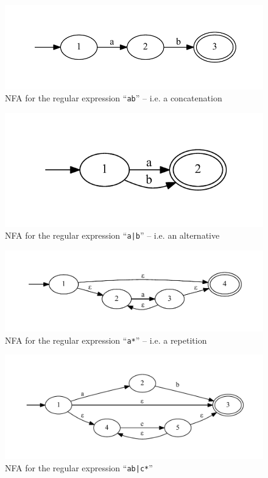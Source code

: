 			\begin{figure}
			\centering
			\includegraphics{figures/re_sequence}
			\caption{NFA for the regular expression ``\lstinline$ab$'' -- i.e. a concatenation}
			\label{fig:re_nfa_concatenation}
			\end{figure}
			
			\begin{figure}
			\centering
			\includegraphics{figures/re_alternative}
			\caption{NFA for the regular expression ``\lstinline$a|b$'' -- i.e. an alternative}
			\label{fig:re_nfa_alternative}
			\end{figure}
			
			\begin{figure}
			\centering
			\includegraphics[width=\textwidth]{figures/re_kleene}
			\caption{NFA for the regular expression ``\lstinline$a*$'' -- i.e. a repetition}
			\label{fig:re_nfa_kleene}
			\end{figure}
			
			\begin{figure}
			\centering
			\includegraphics[width=\textwidth]{figures/re_example}
			\caption{NFA for the regular expression ``\lstinline$ab|c*$''}
			\label{fig:re_nfa_example}
			\end{figure}
			
